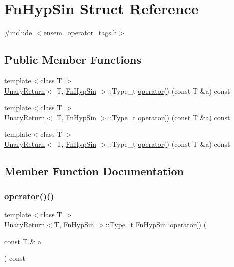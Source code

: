 \hypertarget{structFnHypSin}{}\section{Fn\+Hyp\+Sin Struct Reference}
\label{structFnHypSin}


{\ttfamily \#include $<$ensem\+\_\+operator\+\_\+tags.\+h$>$}

\subsection*{Public Member Functions}
\begin{DoxyCompactItemize}
\item 
{\footnotesize template$<$class T $>$ }\\\mbox{\hyperlink{structUnaryReturn}{Unary\+Return}}$<$ T, \mbox{\hyperlink{structFnHypSin}{Fn\+Hyp\+Sin}} $>$\+::Type\+\_\+t \mbox{\hyperlink{structFnHypSin_adea3b5d45ae2d7b5ab84b310d4d4e339}{operator()}} (const T \&a) const
\item 
{\footnotesize template$<$class T $>$ }\\\mbox{\hyperlink{structUnaryReturn}{Unary\+Return}}$<$ T, \mbox{\hyperlink{structFnHypSin}{Fn\+Hyp\+Sin}} $>$\+::Type\+\_\+t \mbox{\hyperlink{structFnHypSin_adea3b5d45ae2d7b5ab84b310d4d4e339}{operator()}} (const T \&a) const
\item 
{\footnotesize template$<$class T $>$ }\\\mbox{\hyperlink{structUnaryReturn}{Unary\+Return}}$<$ T, \mbox{\hyperlink{structFnHypSin}{Fn\+Hyp\+Sin}} $>$\+::Type\+\_\+t \mbox{\hyperlink{structFnHypSin_adea3b5d45ae2d7b5ab84b310d4d4e339}{operator()}} (const T \&a) const
\end{DoxyCompactItemize}


\subsection{Member Function Documentation}
\mbox{\label{structFnHypSin_adea3b5d45ae2d7b5ab84b310d4d4e339}} 
\subsubsection{\texorpdfstring{operator()()}{operator()()}\hspace{0.1cm}{\footnotesize\ttfamily [1/3]}}
{\footnotesize\ttfamily template$<$class T $>$ \\
\mbox{\hyperlink{structUnaryReturn}{Unary\+Return}}$<$T, \mbox{\hyperlink{structFnHypSin}{Fn\+Hyp\+Sin}} $>$\+::Type\+\_\+t Fn\+Hyp\+Sin\+::operator() (\begin{DoxyParamCaption}\item[{const T \&}]{a }\end{DoxyParamCaption}) const\hspace{0.3cm}{\ttfamily [inline]}}

